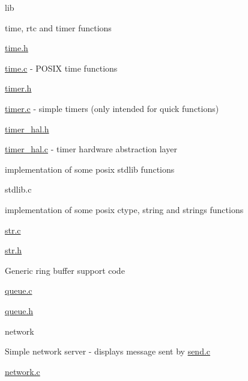 lib
\begin{DoxyItemize}
\item time, rtc and timer functions
\begin{DoxyItemize}
\item \hyperlink{time_8h}{time.\+h}
\item \hyperlink{time_8c}{time.\+c} -\/ P\+O\+S\+IX time functions
\item \hyperlink{timer_8h}{timer.\+h}
\item \hyperlink{timer_8c}{timer.\+c} -\/ simple timers (only intended for quick functions)
\item \hyperlink{timer__hal_8h}{timer\+\_\+hal.\+h}
\item \hyperlink{timer__hal_8c}{timer\+\_\+hal.\+c} -\/ timer hardware abstraction layer
\end{DoxyItemize}
\item implementation of some posix stdlib functions
\begin{DoxyItemize}
\item stdlib.\+c
\end{DoxyItemize}
\item implementation of some posix ctype, string and strings functions
\begin{DoxyItemize}
\item \hyperlink{str_8c}{str.\+c}
\item \hyperlink{str_8h}{str.\+h}
\end{DoxyItemize}
\item Generic ring buffer support code
\begin{DoxyItemize}
\item \hyperlink{queue_8c}{queue.\+c}
\item \hyperlink{queue_8h}{queue.\+h}
\end{DoxyItemize}
\end{DoxyItemize}

network
\begin{DoxyItemize}
\item Simple network server -\/ displays message sent by \hyperlink{send_8c}{send.\+c}
\begin{DoxyItemize}
\item \hyperlink{network_8c}{network.\+c}
\end{DoxyItemize}
\end{DoxyItemize}

